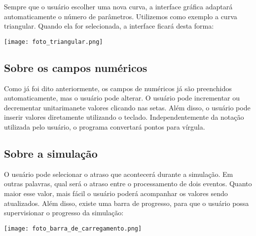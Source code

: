 \documentclass{article}
\begin{document}
            Sempre que o usuário escolher uma nova curva, a interface gráfica
            adaptará automaticamente o número de parâmetros. Utilizemos como 
            exemplo a curva triangular. Quando ela for selecionada, a interface
            ficará desta forma:
            
            \begin{center}
                \texttt{[image: foto\_triangular.png]}
            \end{center}
            
        \subsection{Sobre os campos numéricos}
            Como já foi dito anteriormente, os campos de numéricos já são
            preenchidos automaticamente, mas o usuário pode alterar. O usuário
            pode incrementar ou decrementar unitarimanete valores clicando nas
            setas. Além disso, o usuário pode inserir valores diretamente utilizando
            o teclado. Independentemente da notação utilizada pelo usuário, o
            programa convertará pontos para vírgula.
            
        \subsection{Sobre a simulação}
            O usuário pode selecionar o atraso que acontecerá durante a simulação.
            Em outras palavras, qual será o atraso entre o processamento de dois
            eventos. Quanto maior esse valor, mais fácil o usuário poderá acompanhar
            os valores sendo atualizados. Além disso, existe uma barra de progresso,
            para que o usuário possa supervisionar o progresso da simulação:
            
            \begin{center}
                \texttt{[image: foto\_barra\_de\_carregamento.png]}
            \end{center}
            
\end{document}
